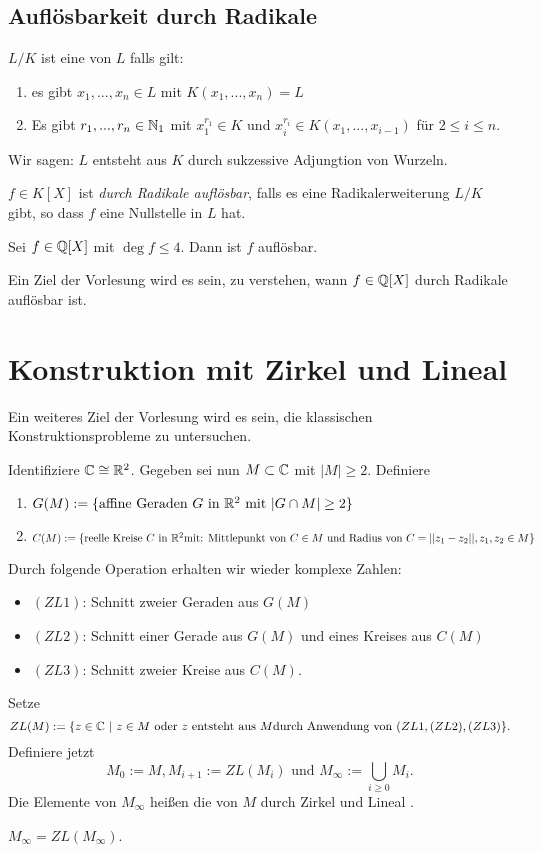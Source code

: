 \section{Auflösbarkeit durch Radikale}
\begin{defn}
	$L/K$ ist eine  von $L$ falls gilt:
	\begin{enumerate}
		\item es gibt $x_1,...,x_n\in L$ mit $K(x_1,...,x_n) = L$
		\item Es gibt $r_1,...,r_n\in \mathbb{N}_1$ mit $x_1^{r_1}\in K$ und $x_i^{r_i}\in K(x_1,...,x_{i-1})$ für $2\leq i\leq n$.
	\end{enumerate}
	Wir sagen: \glqq $L$ entsteht aus $K$ durch sukzessive Adjungtion von Wurzeln\grqq.
\end{defn}
\begin{defn}
	$f\in K[X]$ ist \emph{durch Radikale auflösbar}, falls es eine Radikalerweiterung $L/K$ gibt, so dass $f$ eine Nullstelle in $L$ hat.
\end{defn}
\begin{thm}
	Sei $f\in \mathbb{Q}[X]$ mit $\deg f\leq 4$. Dann ist $f$ auflösbar.
\end{thm}
Ein Ziel der Vorlesung wird es sein, zu verstehen, wann $f\in \mathbb{Q}[X]$ durch Radikale auflösbar ist.

\chapter{Konstruktion mit Zirkel und Lineal}
Ein weiteres Ziel der Vorlesung wird es sein, die klassischen Konstruktionsprobleme zu untersuchen.\par
Identifiziere $\mathbb{C} \cong \mathbb{R}^2$. Gegeben sei nun $M\subset \mathbb{C}$ mit $|M|\geq 2$. Definiere
\begin{enumerate}
	\item $G(M) := \{\text{affine Geraden }G\text{ in }\mathbb{R}^2\text{ mit }|G\cap M|\geq 2\}$
	\item $C(M) := \{\text{reelle Kreise }C\text{ in }\mathbb{R}^2\text{mit: Mittlepunkt von }C\in M\text{ und Radius von }C=||z_1-z_2||,z_1,z_2\in M\}$
\end{enumerate}
Durch folgende Operation erhalten wir wieder komplexe Zahlen:
\begin{itemize}
	\item $(ZL1)$: Schnitt zweier Geraden aus $G(M)$
	\item $(ZL2)$: Schnitt einer Gerade aus $G(M)$ und eines Kreises aus $C(M)$
	\item $(ZL3)$: Schnitt zweier Kreise aus $C(M)$.
\end{itemize}
Setze
\[
ZL(M):= \{z\in \mathbb{C}~|~ z\in M\text{ oder }z\text{ entsteht aus }M\text{durch Anwendung von }(ZL1,(ZL2),(ZL3)\}.
\]
Definiere jetzt
\[
M_0 := M, M_{i+1}:= ZL(M_i)\text{ und }M_{\infty}:= \bigcup_{i\geq 0} M_i.
\]
Die Elemente von $M_{\infty}$ heißen die von $M$ durch Zirkel und Lineal .
\begin{lem}
	$M_{\infty} = ZL(M_{\infty})$.
\end{lem}
